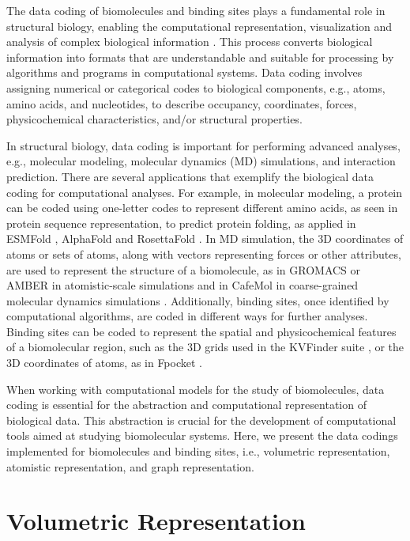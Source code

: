 \documentclass[Ingles]{phdthesis}
\def\ie{i.e.\onedot}
\def\eg{e.g.\onedot}
\begin{document}
The data coding of biomolecules and binding sites plays a fundamental role in structural biology, enabling the computational representation, visualization and analysis of complex biological information \cite{kozlikova2016}. This process converts biological information into formats that are understandable and suitable for processing by algorithms and programs in computational systems. Data coding involves assigning numerical or categorical codes to biological components, \eg, atoms, amino acids, and nucleotides, to describe occupancy, coordinates, forces, physicochemical characteristics, and/or structural properties.

In structural biology, data coding is important for performing advanced analyses, \eg, molecular modeling, molecular dynamics (MD) simulations, and interaction prediction. There are several applications that exemplify the biological data coding for computational analyses. For example, in molecular modeling, a protein can be coded using one-letter codes to represent different amino acids, as seen in protein sequence representation, to predict protein folding, as applied in ESMFold \cite{lin2022}, AlphaFold \cite{jumper2021} and RosettaFold \cite{baek2021}. In MD simulation, the 3D coordinates of atoms or sets of atoms, along with vectors representing forces or other attributes, are used to represent the structure of a biomolecule, as in GROMACS \cite{gromacs} or AMBER \cite{amber} in atomistic-scale simulations and in CafeMol in coarse-grained molecular dynamics simulations \cite{kenzaki2011}. Additionally, binding sites, once identified by computational algorithms, are coded in different ways for further analyses. Binding sites can be coded to represent the spatial and physicochemical features of a biomolecular region, such as the 3D grids used in the KVFinder suite \cite{guerra2019,guerra2020,guerra2021,guerra2023B}, or the 3D coordinates of atoms, as in Fpocket \cite{fpocket}.

When working with computational models for the study of biomolecules, data coding is essential for the abstraction and computational representation of biological data. This abstraction is crucial for the development of computational tools aimed at studying biomolecular systems. Here, we present the data codings implemented for biomolecules and binding sites, \ie, volumetric representation, atomistic representation, and graph representation.

\section{Volumetric Representation}
\end{document}
